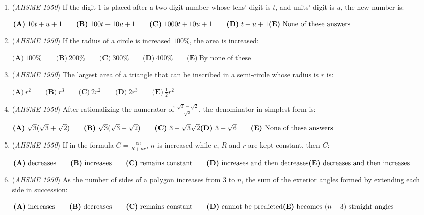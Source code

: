 \begin{enumerate}
	\item (\textit{AHSME 1950}) If the digit $1$ is placed after a two digit number whose tens' digit is $t$, and units' digit is $u$, the new number is:


 $\textbf{(A)}\ 10t+u+1\qquad\textbf{(B)}\ 100t+10u+1\qquad\textbf{(C)}\ 1000t+10u+1\qquad\textbf{(D)}\ t+u+1\qquad\\ \textbf{(E)}\ \text{None of these answers}$


	\item (\textit{AHSME 1950}) If the radius of a circle is increased $100\%$, the area is increased:


 $\textbf{(A)}\ 100\%\qquad\textbf{(B)}\ 200\%\qquad\textbf{(C)}\ 300\%\qquad\textbf{(D)}\ 400\%\qquad\textbf{(E)}\ \text{By none of these}$


	\item (\textit{AHSME 1950}) The largest area of a triangle that can be inscribed in a semi-circle whose radius is $r$ is:


 $\textbf{(A)}\ r^{2}\qquad\textbf{(B)}\ r^{3}\qquad\textbf{(C)}\ 2r^{2}\qquad\textbf{(D)}\ 2r^{3}\qquad\textbf{(E)}\ \frac{1}{2}r^{2}$


	\item (\textit{AHSME 1950}) After rationalizing the numerator of $\frac{\sqrt{3}-\sqrt{2}}{\sqrt{3}}$, the denominator in simplest form is:


 $\textbf{(A)}\ \sqrt{3}(\sqrt{3}+\sqrt{2})\qquad\textbf{(B)}\ \sqrt{3}(\sqrt{3}-\sqrt{2})\qquad\textbf{(C)}\ 3-\sqrt{3}\sqrt{2}\qquad\\ \textbf{(D)}\ 3+\sqrt6\qquad\textbf{(E)}\ \text{None of these answers}$


	\item (\textit{AHSME 1950}) If in the formula $C =\frac{en}{R+nr}$, $n$ is increased while $e$, $R$ and $r$ are kept constant, then $C$:


 $\textbf{(A)}\ \text{decreases}\qquad\textbf{(B)}\ \text{increases}\qquad\textbf{(C)}\ \text{remains constant}\qquad\textbf{(D)}\ \text{increases and then decreases}\qquad\\ \textbf{(E)}\ \text{decreases and then increases}$


	\item (\textit{AHSME 1950}) As the number of sides of a polygon increases from $3$ to $n$, the sum of the exterior angles formed by extending each side in succession:


 $\textbf{(A)}\ \text{increases}\qquad\textbf{(B)}\ \text{decreases}\qquad\textbf{(C)}\ \text{remains constant}\qquad\textbf{(D)}\ \text{cannot be predicted}\qquad\\ \textbf{(E)}\ \text{becomes }(n-3)\text{ straight angles}$



\end{enumerate}
